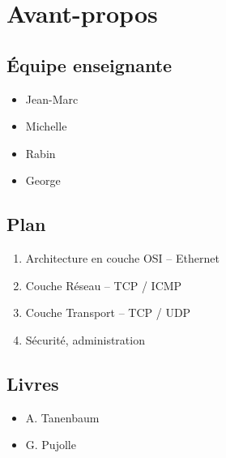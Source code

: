 \documentclass[12pt,a4paper,openany]{book}
\begin{document}
	\thispagestyle{empty} %
	\titleBC{} 
	\dominitoc
	\setcounter{tocdepth}{1}
	\setcounter{secnumdepth}{3}
	\setcounter{minitocdepth}{1}
	\chapter*{Avant-propos}
	\section*{Équipe enseignante}
	\begin{itemize}
		\item Jean-Marc 
		\item Michelle 
		\item Rabin 
		\item George 
	\end{itemize}
	\section*{Plan}
	\begin{enumerate}
		\item Architecture en couche OSI -- Ethernet
		\item Couche Réseau -- TCP / ICMP
		\item Couche Transport -- TCP / UDP
		\item Sécurité, administration
	\end{enumerate}
	\section*{Livres}
	\begin{itemize}
		\item A. Tanenbaum
		\item G. Pujolle
	\end{itemize}
\end{document}
